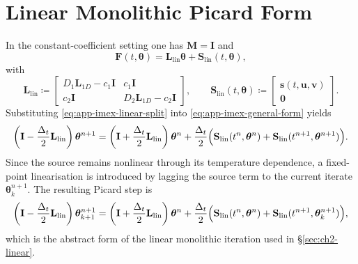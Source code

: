 \section{Linear Monolithic Picard Form}

In the constant-coefficient setting one has $\mathbf{M}=\mathbf{I}$ and
\begin{equation}
    \mathbf{F}(t,\boldsymbol{\theta})
    =
    \mathbf{L}_{\mathrm{lin}} \boldsymbol{\theta}
    +
    \mathbf{S}_{\mathrm{lin}}(t,\boldsymbol{\theta}),
    \label{eq:app-imex-linear-split}
\end{equation}
with
\begin{equation}
    \mathbf{L}_{\mathrm{lin}}
    \coloneqq
    \begin{bmatrix}
        D_1 \mathbf{L}_{1D} - c_1 \mathbf{I} & c_1 \mathbf{I}                       \\
        c_2 \mathbf{I}                       & D_2 \mathbf{L}_{1D} - c_2 \mathbf{I}
    \end{bmatrix},
    \qquad
    \mathbf{S}_{\mathrm{lin}}(t,\boldsymbol{\theta})
    \coloneqq
    \begin{bmatrix}
        \mathbf{s}(t,\mathbf{u},\mathbf{v}) \\
        \mathbf{0}
    \end{bmatrix}.
\end{equation}
Substituting \eqref{eq:app-imex-linear-split} into \eqref{eq:app-imex-general-form} yields
\begin{equation}
    \left(\mathbf{I} - \frac{\Delta_t}{2}\mathbf{L}_{\mathrm{lin}}\right)\boldsymbol{\theta}^{n+1}
    =
    \left(\mathbf{I} + \frac{\Delta_t}{2}\mathbf{L}_{\mathrm{lin}}\right)\boldsymbol{\theta}^{n}
    +
    \frac{\Delta_t}{2}
    \Bigl(
    \mathbf{S}_{\mathrm{lin}}(t^n,\boldsymbol{\theta}^n)
    +
    \mathbf{S}_{\mathrm{lin}}(t^{n+1},\boldsymbol{\theta}^{n+1})
    \Bigr).
    \label{eq:app-imex-linear-cn}
\end{equation}
Since the source remains nonlinear through its temperature dependence, a fixed-point linearisation is introduced by lagging the source term to the current iterate $\boldsymbol{\theta}^{n+1}_{k}$. The resulting Picard step is
\begin{equation}
    \left(\mathbf{I} - \frac{\Delta_t}{2}\mathbf{L}_{\mathrm{lin}}\right)\boldsymbol{\theta}^{n+1}_{k+1}
    =
    \left(\mathbf{I} + \frac{\Delta_t}{2}\mathbf{L}_{\mathrm{lin}}\right)\boldsymbol{\theta}^{n}
    +
    \frac{\Delta_t}{2}
    \Bigl(
    \mathbf{S}_{\mathrm{lin}}(t^n,\boldsymbol{\theta}^n)
    +
    \mathbf{S}_{\mathrm{lin}}(t^{n+1},\boldsymbol{\theta}^{n+1}_{k})
    \Bigr),
    \label{eq:app-imex-linear-picard}
\end{equation}
which is the abstract form of the linear monolithic iteration used in \S\ref{sec:ch2-linear}.

